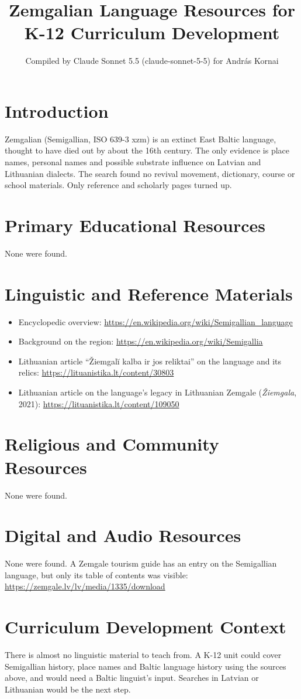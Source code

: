 \documentclass[12pt]{article}
\title{Zemgalian Language Resources for K-12 Curriculum Development}
\author{Compiled by Claude Sonnet 5.5 (claude-sonnet-5-5) for Andr\'as Kornai}
\date{}
\begin{document}
\maketitle

\section{Introduction}
Zemgalian (Semigallian, ISO 639-3 xzm) is an extinct East Baltic language, thought to have died out by about the 16th century. The only evidence is place names, personal names and possible substrate influence on Latvian and Lithuanian dialects. The search found no revival movement, dictionary, course or school materials. Only reference and scholarly pages turned up.

\section{Primary Educational Resources}
None were found.

\section{Linguistic and Reference Materials}
\begin{itemize}
\item Encyclopedic overview: \url{https://en.wikipedia.org/wiki/Semigallian_language}
\item Background on the region: \url{https://en.wikipedia.org/wiki/Semigallia}
\item Lithuanian article ``\v Ziemgali\u{} kalba ir jos reliktai'' on the language and its relics: \url{https://lituanistika.lt/content/30803}
\item Lithuanian article on the language's legacy in Lithuanian Zemgale (\emph{\v Ziemgala}, 2021): \url{https://lituanistika.lt/content/109050}
\end{itemize}

\section{Religious and Community Resources}
None were found.

\section{Digital and Audio Resources}
None were found. A Zemgale tourism guide has an entry on the Semigallian language, but only its table of contents was visible: \url{https://zemgale.lv/lv/media/1335/download}

\section{Curriculum Development Context}
There is almost no linguistic material to teach from. A K-12 unit could cover Semigallian history, place names and Baltic language history using the sources above, and would need a Baltic linguist's input. Searches in Latvian or Lithuanian would be the next step.
\end{document}
